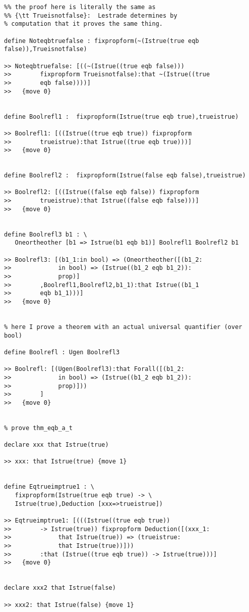 \documentclass[12pt]{article}
\begin{document}
\begin{verbatim}
%% the proof here is literally the same as 
%% {\tt Trueisnotfalse}:  Lestrade determines by
% computation that it proves the same thing.

define Noteqbtruefalse : fixpropform(~(Istrue(true eqb false)),Trueisnotfalse)

>> Noteqbtruefalse: [((~(Istrue((true eqb false))) 
>>        fixpropform Trueisnotfalse):that ~(Istrue((true 
>>        eqb false))))]
>>   {move 0}


define Boolrefl1 :  fixpropform(Istrue(true eqb true),trueistrue)

>> Boolrefl1: [((Istrue((true eqb true)) fixpropform 
>>        trueistrue):that Istrue((true eqb true)))]
>>   {move 0}


define Boolrefl2 :  fixpropform(Istrue(false eqb false),trueistrue)

>> Boolrefl2: [((Istrue((false eqb false)) fixpropform 
>>        trueistrue):that Istrue((false eqb false)))]
>>   {move 0}


define Boolrefl3 b1 : \
   Oneortheother [b1 => Istrue(b1 eqb b1)] Boolrefl1 Boolrefl2 b1

>> Boolrefl3: [(b1_1:in bool) => (Oneortheother([(b1_2:
>>             in bool) => (Istrue((b1_2 eqb b1_2)):
>>             prop)]
>>        ,Boolrefl1,Boolrefl2,b1_1):that Istrue((b1_1 
>>        eqb b1_1)))]
>>   {move 0}


% here I prove a theorem with an actual universal quantifier (over bool)

define Boolrefl : Ugen Boolrefl3

>> Boolrefl: [(Ugen(Boolrefl3):that Forall([(b1_2:
>>             in bool) => (Istrue((b1_2 eqb b1_2)):
>>             prop)]))
>>        ]
>>   {move 0}


% prove thm_eqb_a_t

declare xxx that Istrue(true)

>> xxx: that Istrue(true) {move 1}


define Eqtrueimptrue1 : \
   fixpropform(Istrue(true eqb true) -> \
   Istrue(true),Deduction [xxx=>trueistrue])

>> Eqtrueimptrue1: [(((Istrue((true eqb true)) 
>>        -> Istrue(true)) fixpropform Deduction([(xxx_1:
>>             that Istrue(true)) => (trueistrue:
>>             that Istrue(true))]))
>>        :that (Istrue((true eqb true)) -> Istrue(true)))]
>>   {move 0}


declare xxx2 that Istrue(false)

>> xxx2: that Istrue(false) {move 1}



\end{verbatim}
\end{document}
